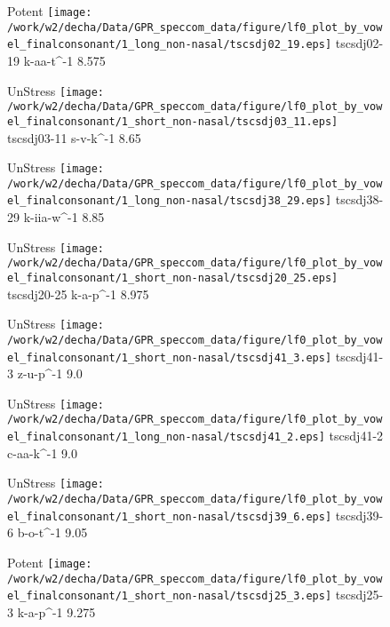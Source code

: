 \documentclass{article}
\begin{document}
\begin{figure}[t]
\begin{minipage}[b]{.24\textwidth}
\colorbox{Apricot}{Potent}
\centering
\texttt{[image: /work/w2/decha/Data/GPR\_speccom\_data/figure/lf0\_plot\_by\_vowel\_finalconsonant/1\_long\_non-nasal/tscsdj02\_19.eps]}
tscsdj02-19 k-aa-t\textasciicircum-1 8.575
\end{minipage}
\begin{minipage}[b]{.24\textwidth}
UnStress
\centering
\texttt{[image: /work/w2/decha/Data/GPR\_speccom\_data/figure/lf0\_plot\_by\_vowel\_finalconsonant/1\_short\_non-nasal/tscsdj03\_11.eps]}
tscsdj03-11 s-v-k\textasciicircum-1 8.65
\end{minipage}
\begin{minipage}[b]{.24\textwidth}
UnStress
\centering
\texttt{[image: /work/w2/decha/Data/GPR\_speccom\_data/figure/lf0\_plot\_by\_vowel\_finalconsonant/1\_long\_non-nasal/tscsdj38\_29.eps]}
tscsdj38-29 k-iia-w\textasciicircum-1 8.85
\end{minipage}
\begin{minipage}[b]{.24\textwidth}
UnStress
\centering
\texttt{[image: /work/w2/decha/Data/GPR\_speccom\_data/figure/lf0\_plot\_by\_vowel\_finalconsonant/1\_short\_non-nasal/tscsdj20\_25.eps]}
tscsdj20-25 k-a-p\textasciicircum-1 8.975
\end{minipage}
\end{figure}
\clearpage
\begin{figure}[t]
\begin{minipage}[b]{.24\textwidth}
UnStress
\centering
\texttt{[image: /work/w2/decha/Data/GPR\_speccom\_data/figure/lf0\_plot\_by\_vowel\_finalconsonant/1\_short\_non-nasal/tscsdj41\_3.eps]}
tscsdj41-3 z-u-p\textasciicircum-1 9.0
\end{minipage}
\begin{minipage}[b]{.24\textwidth}
UnStress
\centering
\texttt{[image: /work/w2/decha/Data/GPR\_speccom\_data/figure/lf0\_plot\_by\_vowel\_finalconsonant/1\_long\_non-nasal/tscsdj41\_2.eps]}
tscsdj41-2 c-aa-k\textasciicircum-1 9.0
\end{minipage}
\begin{minipage}[b]{.24\textwidth}
UnStress
\centering
\texttt{[image: /work/w2/decha/Data/GPR\_speccom\_data/figure/lf0\_plot\_by\_vowel\_finalconsonant/1\_short\_non-nasal/tscsdj39\_6.eps]}
tscsdj39-6 b-o-t\textasciicircum-1 9.05
\end{minipage}
\begin{minipage}[b]{.24\textwidth}
\colorbox{Apricot}{Potent}
\centering
\texttt{[image: /work/w2/decha/Data/GPR\_speccom\_data/figure/lf0\_plot\_by\_vowel\_finalconsonant/1\_short\_non-nasal/tscsdj25\_3.eps]}
tscsdj25-3 k-a-p\textasciicircum-1 9.275
\end{minipage}
\end{figure}
\end{document}
